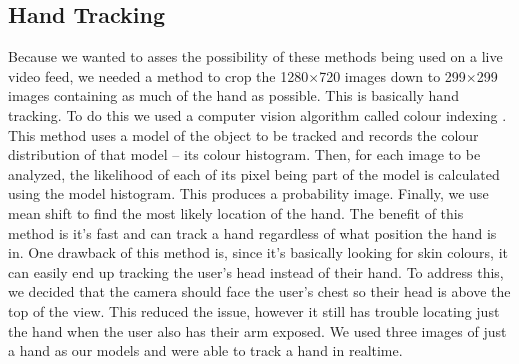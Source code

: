 \subsection{Hand Tracking}
Because we wanted to asses the possibility of these methods being used on a live video feed, we needed a method to crop the 1280$\times$720 images down to 299$\times$299 images containing as much of the hand as possible. This is basically hand tracking. To do this we used a computer vision algorithm called colour indexing \cite{swain}. This method uses a model of the object to be tracked and records the colour distribution of that model -- its colour histogram. Then, for each image to be analyzed, the likelihood of each of its pixel being part of the model is calculated using the model histogram. This produces a probability image. Finally, we use mean shift to find the most likely location of the hand. The benefit of this method is it's fast and can track a hand regardless of what position the hand is in. One drawback of this method is, since it's basically looking for skin colours, it can easily end up tracking the user's head instead of their hand. To address this, we decided that the camera should face the user's chest so their head is above the top of the view. This reduced the issue, however it still has trouble locating just the hand when the user also has their arm exposed. We used three images of just a hand as our models and were able to track a hand in realtime. 
